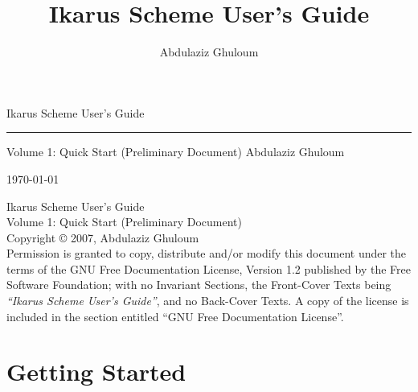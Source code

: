 \documentclass[onecolumn, 12pt, twoside, openright, dvipdfm]{book}
\begin{document}
\frontmatter
\title{Ikarus Scheme User's Guide}

\author{Abdulaziz Ghuloum}

\pagestyle{empty}

\mbox{}
\vspace{3in}

{
\fontsize{66}{66}
\begin{center}
Ikarus Scheme User's Guide
\end{center} }
\noindent
\rule{\textwidth}{6pt} 
{\fontsize{18}{18}
\hfill{}
Volume 1: Quick Start (Preliminary Document)
}
\vfill
{
\fontsize{24}{24}
\hfill{} Abdulaziz Ghuloum
}

{
\fontsize{18}{18}
\hfill{} \today
}

\newpage
\mbox{}
\vfill{}
\noindent
Ikarus Scheme User's Guide\\
Volume 1: Quick Start (Preliminary Document)\\
Copyright \copyright{} 2007,  Abdulaziz Ghuloum\\

\noindent
Permission is granted to copy, distribute and/or modify this
document under the terms of the GNU Free Documentation License,
Version 1.2 published by the Free Software
Foundation; with no Invariant Sections, the Front-Cover Texts
being \emph{``Ikarus Scheme User's Guide''}, and
no Back-Cover Texts.  A copy of the license is included in the
section entitled ``GNU Free Documentation License''.

\newpage

\pagestyle{fancy}
\tableofcontents

\newpage

% 
% 
% 




\mainmatter
\setlength{\parindent}{0pt} 
\setlength{\parskip}{2.0ex plus 0ex minus 0ex}
\chapter{Getting Started}
\end{document}
